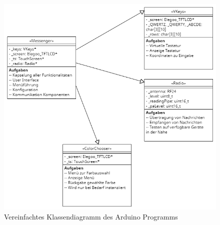 \documentclass[a4paper, 11pt]{scrartcl}
\begin{document}
\begin{small}
\begin{figure}[H]
    \begin{center}
        \includegraphics[scale=0.5]{Bilder/Class_Diagram.png}
        \caption{Vereinfachtes Klassendiagramm des Arduino Programms}\label{diag:classdiag}
    \end{center}
\end{figure}


\end{small}
\end{document}
